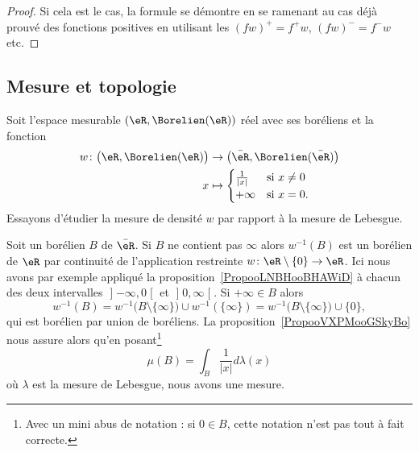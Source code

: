 \begin{proof}
	Si cela est le cas, la formule se démontre en se ramenant au cas déjà prouvé des fonctions positives en utilisant les \( (fw)^+=f^+w\), \( (fw)^-=f^-w\) etc.
\end{proof}

\subsection{Mesure et topologie}

\begin{example}      \label{EXooKQDRooVMWaEC}
	Soit l'espace mesurable \( (\eR,\Borelien(\eR))\) réel avec ses boréliens et la fonction
	\begin{equation}
		\begin{aligned}
			w\colon \big( \eR,\Borelien(\eR) \big) & \to\big( \bar \eR,\Borelien(\bar \eR) \big)    \\
			x                                      & \mapsto \begin{cases}
				                                                 \frac{1}{ | x | } & \text{si } x\neq 0 \\
				                                                 +\infty           & \text{si }x=0.
			                                                 \end{cases}
		\end{aligned}
	\end{equation}
	Essayons d'étudier la mesure de densité \( w\) par rapport à la mesure de Lebesgue.
	\begin{subproof}
		Soit un borélien \( B\) de \( \bar \eR\). Si \( B\) ne contient pas \( \infty\) alors \( w^{-1}(B)\) est un borélien de \( \eR\) par continuité de l'application restreinte \( w\colon \eR\setminus\{ 0 \}\to \eR \). Ici nous avons par exemple appliqué la proposition~\ref{PropooLNBHooBHAWiD} à chacun des deux intervalles \( \mathopen] -\infty , 0 \mathclose[\) et \( \mathopen] 0 , \infty \mathclose[\). Si \( +\infty\in B\) alors
		\begin{equation}
			w^{-1}(B)=w^{-1}\big( B\setminus\{ \infty \} \big)\cup w^{-1}(\{ \infty \})=  w^{-1}\big( B\setminus\{ \infty \} \big)\cup \{ 0 \},
		\end{equation}
		qui est borélien par union de boréliens.
		La proposition~\ref{PropooVXPMooGSkyBo} nous assure alors qu'en posant\footnote{Avec un mini abus de notation : si \( 0\in B\), cette notation n'est pas tout à fait correcte.}
		\begin{equation}
			\mu(B)=\int_B\frac{1}{ | x | }d\lambda(x)
		\end{equation}
		où \(  \lambda \) est la mesure de Lebesgue, nous avons une mesure.


\end{subproof}
\end{example}
